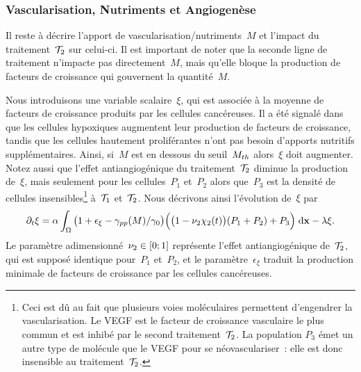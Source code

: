\documentclass[main.tex]{subfiles}
\begin{document}
\subsubsection{Vascularisation, Nutriments et Angiogenèse}
Il reste à décrire l'apport de vascularisation/nutriments~$M$ 
et l'impact du traitement~${\mathcal T_2}$ sur celui-ci. Il est important de noter que la seconde ligne de traitement n'impacte pas directement~$M$, mais qu'elle bloque la production de facteurs de croissance qui gouvernent la quantité~$M$.

Nous introduisons une variable scalaire~$\xi$, qui est associée à la moyenne de facteurs de croissance produits par les cellules cancéreuses. 
Il a été signalé dans~\cite{Holmes2007} que les cellules hypoxiques augmentent leur production de facteurs de croissance, tandis que les cellules hautement proliférantes n'ont pas besoin d'apports nutritifs supplémentaires. Ainsi, si~$M$ est en dessous du seuil~$M_{th}$ alors~$\xi$ doit augmenter. 
Notez aussi que l'effet antiangiogénique du 
traitement~${\mathcal T_2}$ diminue la production
de~$\xi$, mais seulement pour les cellules~$P_1$ et~$P_2$ alors que~$P_3$ est la densité de cellules insensibles\footnote{Ceci est dû au fait que plusieurs voies moléculaires permettent d'engendrer la vascularisation. Le VEGF est le facteur de croissance vasculaire le plus commun  et est inhibé par le second traitement~${\mathcal T_2}$. La population $P_3$ émet un autre type de molécule que le VEGF pour se néovasculariser~: elle est donc insensible au traitement~${\mathcal T_2}$.} à~${\mathcal T_1}$ et~${\mathcal T_2}$.
Nous décrivons ainsi l'évolution de~$\xi$ par
\begin{equation}\label{eq_xi}
\partial_t \xi = \alpha \int_\Omega \big(1+\epsilon_{\xi} - \gamma_{pp}(M) / \gamma_0 \big)\Big(\big(1-\nu_2\chi_2(t)\big)(P_1+P_2)+P_3\Big) \textrm{\;d}\mathbf{x} - \lambda \xi.
\end{equation}
Le paramètre adimensionné~$\nu_2\in [0;1]$ représente l'effet antiangiogénique de~${\mathcal T_2}$, qui est supposé identique pour~$P_1$ et~$P_2$, et le paramètre~$\epsilon_{\xi}$ traduit la production minimale de facteurs de croissance par les cellules cancéreuses. 
\end{document}

